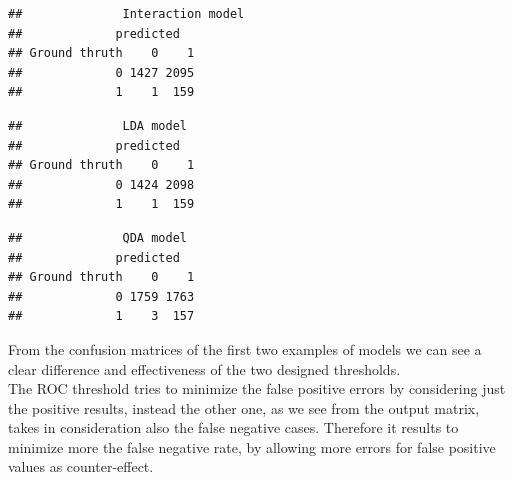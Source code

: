\documentclass[
]{article}
\newenvironment{Shaded}{\begin{snugshade}}{\end{snugshade}}
\newcommand{\AttributeTok}[1]{\textcolor[rgb]{0.77,0.63,0.00}{#1}}
\newcommand{\DecValTok}[1]{\textcolor[rgb]{0.00,0.00,0.81}{#1}}
\newcommand{\FunctionTok}[1]{\textcolor[rgb]{0.00,0.00,0.00}{#1}}
\newcommand{\NormalTok}[1]{#1}
\newcommand{\OtherTok}[1]{\textcolor[rgb]{0.56,0.35,0.01}{#1}}
\newcommand{\SpecialCharTok}[1]{\textcolor[rgb]{0.00,0.00,0.00}{#1}}
\newcommand{\StringTok}[1]{\textcolor[rgb]{0.31,0.60,0.02}{#1}}
\begin{document}
\begin{verbatim}
##              Interaction model
##             predicted
## Ground thruth    0    1
##             0 1427 2095
##             1    1  159
\end{verbatim}

\begin{Shaded}
\end{Shaded}

\begin{verbatim}
##              LDA model
##             predicted
## Ground thruth    0    1
##             0 1424 2098
##             1    1  159
\end{verbatim}

\begin{Shaded}
\end{Shaded}

\begin{verbatim}
##              QDA model
##             predicted
## Ground thruth    0    1
##             0 1759 1763
##             1    3  157
\end{verbatim}

From the confusion matrices of the first two examples of models we can
see a clear difference and effectiveness of the two designed
thresholds.\\
The ROC threshold tries to minimize the false positive errors by
considering just the positive results, instead the other one, as we see
from the output matrix, takes in consideration also the false negative
cases. Therefore it results to minimize more the false negative rate, by
allowing more errors for false positive values as counter-effect.
\end{document}
